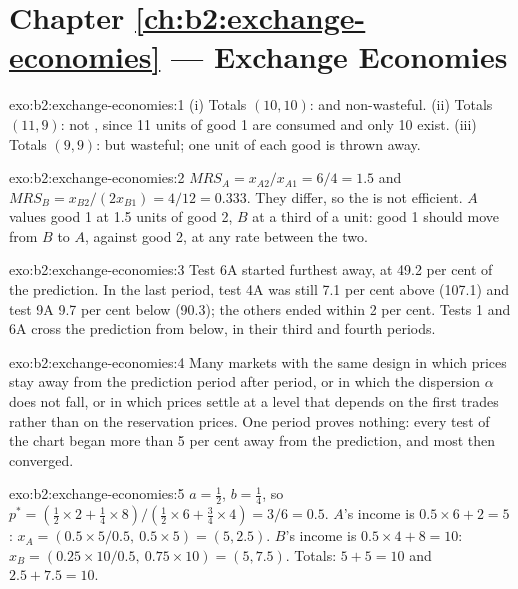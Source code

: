 \section*{Chapter \ref{ch:b2:exchange-economies} --- Exchange Economies}

\begin{solution}{exo:b2:exchange-economies:1}
(i) Totals $(10, 10)$:  and non-wasteful. (ii) Totals $(11, 9)$: not , since 11 units of
good 1 are consumed and only 10 exist. (iii) Totals $(9, 9)$:  but wasteful; one unit of each
good is thrown away.
\end{solution}

\begin{solution}{exo:b2:exchange-economies:2}
$\mathit{MRS}_A = x_{A2}/x_{A1} = 6/4 = 1.5$ and $\mathit{MRS}_B = x_{B2}/(2x_{B1}) = 4/12 = 0.333$. They
differ, so the  is not efficient. $A$ values good 1 at 1.5 units of good 2, $B$ at a third of a
unit: good 1 should move from $B$ to $A$, against good 2, at any rate between the two.
\end{solution}

\begin{solution}{exo:b2:exchange-economies:3}
Test 6A started furthest away, at 49.2 per cent of the prediction. In the last period, test 4A was still
7.1 per cent above (107.1) and test 9A 9.7 per cent below (90.3); the others ended within 2 per cent.
Tests 1 and 6A cross the prediction from below, in their third and fourth periods.
\end{solution}

\begin{solution}{exo:b2:exchange-economies:4}
Many markets with the same design in which prices stay away from the prediction period after period, or
in which the dispersion $\alpha$ does not fall, or in which prices settle at a level that depends on the
first trades rather than on the reservation prices. One period proves nothing: every test of the chart
began more than 5 per cent away from the prediction, and most then converged.
\end{solution}

\begin{solution}{exo:b2:exchange-economies:5}
$a = \tfrac12$, $b = \tfrac14$, so $p^* = (\tfrac12 \times 2 + \tfrac14 \times 8)/(\tfrac12 \times 6 +
\tfrac34 \times 4) = 3/6 = 0.5$. $A$'s income is $0.5 \times 6 + 2 = 5$: $x_A = (0.5 \times 5/0.5,\ 0.5
\times 5) = (5, 2.5)$. $B$'s income is $0.5 \times 4 + 8 = 10$: $x_B = (0.25 \times 10/0.5,\ 0.75 \times
10) = (5, 7.5)$. Totals: $5 + 5 = 10$ and $2.5 + 7.5 = 10$.
\end{solution}

